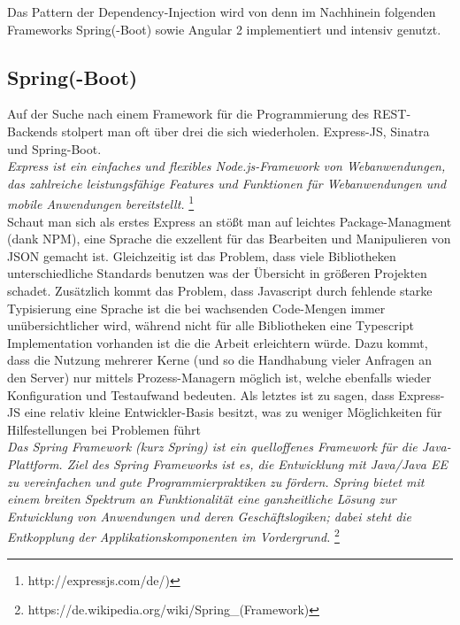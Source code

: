 Das Pattern der Dependency-Injection wird von denn im Nachhinein folgenden Frameworks Spring(-Boot) sowie Angular 2 implementiert und intensiv genutzt.





\subsection{Spring(-Boot)}


Auf der Suche nach einem Framework für die Programmierung des REST-Backends stolpert man oft über drei die sich wiederholen. Express-JS, Sinatra und Spring-Boot. \\


\emph{\glqq   
Express ist ein einfaches und flexibles Node.js-Framework von Webanwendungen, das zahlreiche leistungsfähige Features und Funktionen für Webanwendungen und mobile Anwendungen bereitstellt.
\grqq} \footnote{http://expressjs.com/de/)} \\

Schaut man sich als erstes Express an stößt man auf leichtes Package-Managment (dank NPM), eine Sprache die exzellent für das Bearbeiten und Manipulieren von JSON gemacht ist. Gleichzeitig ist das Problem, dass viele Bibliotheken unterschiedliche Standards benutzen was der Übersicht in größeren Projekten schadet. Zusätzlich kommt das Problem, dass Javascript durch fehlende starke Typisierung eine Sprache ist die bei wachsenden Code-Mengen immer unübersichtlicher wird, während nicht für alle Bibliotheken eine Typescript Implementation vorhanden ist die die Arbeit erleichtern würde. Dazu kommt, dass die Nutzung mehrerer Kerne (und so die Handhabung vieler Anfragen an den Server) nur mittels Prozess-Managern möglich ist, welche ebenfalls wieder Konfiguration und Testaufwand bedeuten. Als letztes ist zu sagen, dass Express-JS eine relativ kleine Entwickler-Basis besitzt, was zu weniger Möglichkeiten für Hilfestellungen bei Problemen führt \\


\emph{\glqq   
Das Spring Framework (kurz Spring) ist ein quelloffenes Framework für die Java-Plattform. Ziel des Spring Frameworks ist es, die Entwicklung mit Java/Java EE zu vereinfachen und gute Programmierpraktiken zu fördern. Spring bietet mit einem breiten Spektrum an Funktionalität eine ganzheitliche Lösung zur Entwicklung von Anwendungen und deren Geschäftslogiken; dabei steht die Entkopplung der Applikationskomponenten im Vordergrund.
\grqq} \footnote{https://de.wikipedia.org/wiki/Spring\_(Framework)} \\

